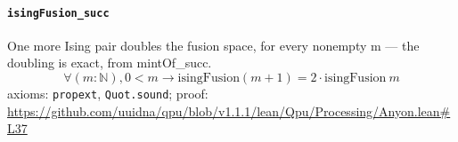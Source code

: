 \documentclass[11pt]{article}
\begin{document}
\paragraph{\texttt{isingFusion\_succ}}
One more Ising pair doubles the fusion space, for every nonempty m — the doubling is exact, from mintOf\_succ.
\[ \forall (m : \mathbb{N}), 0 < m \to \mathrm{isingFusion} (m + 1) = 2 \cdot \mathrm{isingFusion}\ m \]
\noindent axioms: \texttt{propext}, \texttt{Quot.sound}; proof: \url{https://github.com/uuidna/qpu/blob/v1.1.1/lean/Qpu/Processing/Anyon.lean\#L37}
\end{document}
